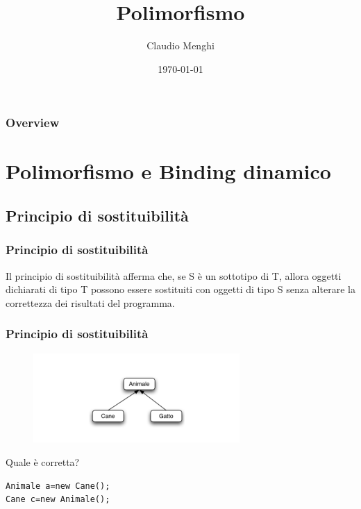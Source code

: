 \documentclass{beamer}
\title[Generici e Collezioni]{Polimorfismo} %
\author{Claudio Menghi} %
\institute[Polimi] %
{
Politecnico di Milano \\ %
\medskip
\textit{claudio.menghi@polimi.it} %
}
\date{\today} %
\begin{document}
\begin{frame}
\titlepage %
\end{frame}

\begin{frame}
\frametitle{Overview} %
\tableofcontents %
\end{frame}





\section{Polimorfismo e Binding dinamico}
\subsection{Principio di sostituibilit\`a}

\begin{frame}
\frametitle{Principio di sostituibilit\`a}
\begin{framed}
Il principio di sostituibilit\`a afferma che, se S \`e un sottotipo di T, allora oggetti dichiarati di tipo T possono essere sostituiti con oggetti di tipo S senza alterare la correttezza dei risultati del programma.
\end{framed}
\end{frame}

\begin{frame}[fragile]
\frametitle{Principio di sostituibilit\`a}
\begin{figure}[h!]
  \centering
    \includegraphics[width=0.7\textwidth]{gerarchia.pdf}
\end{figure}

Quale \`e corretta?
\begin{framed}
\begin{lstlisting}
Animale a=new Cane();
Cane c=new Animale();
\end{lstlisting}
\end{framed}
\end{frame}
\end{document}
